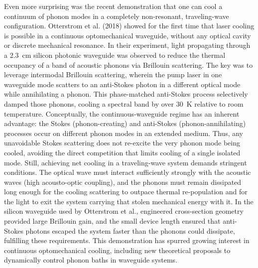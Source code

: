 Even more surprising was the recent demonstration that one can cool a continuum of phonon modes in a completely non-resonant, traveling-wave configuration. \cite{otterstrom2018optomechanical} Otterstrom et al. (2018) showed for the first time that laser cooling is possible in a continuous optomechanical waveguide, without any optical cavity or discrete mechanical resonance. In their experiment, light propagating through a \SI{2.3}{\centi\meter} silicon photonic waveguide was observed to reduce the thermal occupancy of a band of acoustic phonons via Brillouin scattering. The key was to leverage intermodal Brillouin scattering, wherein the pump laser in one waveguide mode scatters to an anti-Stokes photon in a different optical mode while annihilating a phonon. This phase-matched anti-Stokes process selectively damped those phonons, cooling a spectral band by over \SI{30}{\kelvin} relative to room temperature. Conceptually, the continuous-waveguide regime has an inherent advantage: the Stokes (phonon-creating) and anti-Stokes (phonon-annihilating) processes occur on different phonon modes in an extended medium. Thus, any unavoidable Stokes scattering does not re-excite the very phonon mode being cooled, avoiding the direct competition that limits cooling of a single isolated mode. Still, achieving net cooling in a traveling-wave system demands stringent conditions. The optical wave must interact sufficiently strongly with the acoustic waves (high acousto-optic coupling), and the phonons must remain dissipated long enough for the cooling scattering to outpace thermal re-population and for the light to exit the system carrying that stolen mechanical energy with it. In the silicon waveguide used by Otterstrom et al., engineered cross-section geometry provided large Brillouin gain, and the small device length ensured that anti-Stokes photons escaped the system faster than the phonons could dissipate, fulfilling these requirements. \cite{otterstrom2018optomechanical} This demonstration has spurred growing interest in continuous optomechanical cooling, including new theoretical proposals to dynamically control phonon baths in waveguide systems. \cite{zhu2023dynamic}

